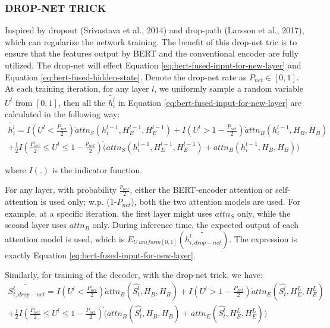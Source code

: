 \documentclass{report}
\begin{document}
\subsubsection{DROP-NET TRICK}
\label{sssec:drop-net-trick}
Inspired by dropout (Srivastava et al., 2014) and drop-path (Larsson et al., 2017), which can regularize the network training. The benefit of this drop-net tric is to ensure that the features output by BERT and the conventional encoder are fully utilized. The drop-net will effect Equation \ref{eq:bert-fused-input-for-new-layer} and Equation \ref{eq:bert-fused-hidden-state}. Denote the drop-net rate as $P_{net} \in [0,1]$. At each training iteration, for any layer $l$, we uniformly sample a random variable $U^l$ from $[0,1]$, then all the $\tilde{h_i^l}$ in Equation \ref{eq:bert-fused-input-for-new-layer} are calculated in the following way:
\begin{equation}
	\begin{aligned}
	\tilde{h_i^l}= I(U^l < \frac{P_{net}}{2}) \dot attn_S(h_i^{l-1}, H_E^{l-1}, H_E^{l-1}) + I(U^l > 1- \frac{P_{net}}{2}) \dot attn_B(h_i^{l-1}, H_B, H_B) \\
	+ \frac{1}{2} I(\frac{P_{net}}{2} \leq U^l \leq 1-\frac{p_{net}}{2}) \dot  (attn_S(h_i^{l-1}, H_E^{l-1}, H_E^{l-1}) + attn_B(h_i^{l-1}, H_B, H_B)) 
	\label{eq:bert-fused-input-for-new-layer-with-drop-net} %
\end{aligned}
\end{equation}

where $I(.)$ is the indicator function.

For any layer, with probability $\frac{p_{net}}{2}$, either the BERT-encoder attention or self-attention is used only; w.p. (1-$P_{net}$), both the two attention models are used. For example, at a specific iteration, the first layer might uses $attn_S$ only, while the second layer uses $attn_B$ only. During inference time, the expected output of each attention model is used, which is $E_{U~uniform[0,1]}(\tilde{h_{i, drop-net}^l})$. The expression is exactly Equation \ref{eq:bert-fused-input-for-new-layer}. 

Similarly, for training of the decoder, with the drop-net trick, we have:
\begin{equation}
	\begin{aligned}
	\tilde{S_{t, drop-net}^l}=I(U^l < \frac{P_{net}}{2}) \dot attn_B(\hat{S_t^l}, H_B, H_B) + I(U^l > 1- \frac{P_{net}}{2}) \dot attn_E(\hat{S_t^l}, H_E^L, H_E^L) \\
	    + \frac{1}{2} I(\frac{P_{net}}{2} \leq U^l \leq 1-\frac{P_{net}}{2}) \dot (attn_B(\hat{S_t^l}, H_B, H_B) + attn_E(\hat{S_t^l}, H_E^L, H_E^L))
	    \label{eq:bert-fused-hidden-state-with-drop-net} %
    \end{aligned}
    \end{equation}
\end{document}
